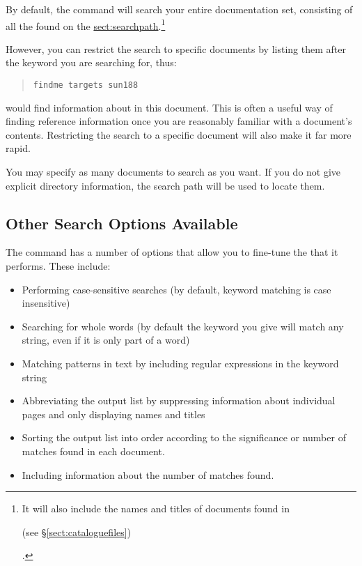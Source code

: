 By default, the  command will search your
entire documentation set, consisting of all the
 found on the
\hyperref{\hi{HTX\_PATH} search path}{\hi{HTX\_PATH} search path (see
\S}{)}{sect:searchpath}.\footnote{It will also include the names and
titles of documents found in \begin{latexonly} (see
\S\ref{sect:cataloguefiles})
\end{latexonly}.}

However, you can restrict the search to specific documents by listing
them after the keyword you are searching for, thus:

\begin{quote}
\begin{verbatim}
findme targets sun188
\end{verbatim}
\end{quote}

would find information about  in this document. This is
often a useful way of finding reference information once you are
reasonably familiar with a document's contents. Restricting the search
to a specific document will also make it far more rapid.

You may specify as many documents to search as you want. If you do not
give explicit directory information, the  search path
will be used to locate them.

\subsection{Other Search Options Available}

The  command has a number of options that allow
you to fine-tune the  that
it performs. These include:

\begin{itemize}
\item Performing case-sensitive searches (by default, keyword matching
is case insensitive)

\item Searching for whole words (by default the keyword you give will
match any string, even if it is only part of a word)

\item Matching patterns in text by including regular expressions in
the keyword string

\item Abbreviating the output list by suppressing information about
individual  pages and only displaying
 names and titles

\item Sorting the output list into order according to the significance
or number of matches found in each document.

\item Including information about the number of matches found.
\end{itemize}


